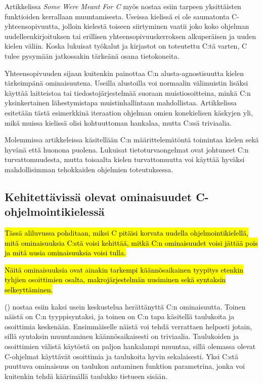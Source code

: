 Artikkelissa \emph{Some Were Meant For C} \citet{somemeantforc} myös nostaa
esiin tarpeen yksittäisten funktioiden kerrallaan muuntamisesta. Useissa
kielissä ei ole saumatonta C-yhteensopivuutta, jolloin kielestä toiseen
siirtyminen vaatii joko koko ohjelman uudelleenkirjoituksen tai erillisen
yhteensopivuuskerroksen alkuperäisen ja uuden kielen väliin. Koska lukuisat
työkalut ja kirjastot on toteutettu C:tä varten, C tulee pysymään jatkossakin
tärkeänä osana tietokoneita.

Yhteensopivuuden sijaan \citeauthor{somemeantforc} kuitenkin painottaa C:n
alusta-agnostisuutta kielen tärkeimpänä ominaisuutena. Useilla alustoilla
voi normaalin välimuistin lisäksi käyttää laitteistoa tai tiedostojärjestelmää
suoraan muistiosoitteina, minkä C:n yksinkertainen lähestymistapa
muistinhallintaan mahdollistaa. Artikkelissa esitetään tästä esimerkkinä
iteraation ohjelman omien konekielisen käskyjen yli, mikä muissa kielissä olisi
kohtuuttoman hankalaa, mutta C:ssä triviaalia.

Molemmissa artikkeleissa käsitellään C:n määrittelemätöntä toimintaa kielen
sekä hyvänä että huonona puolena. Lukuisat tietoturvaongelmat ovat johtuneet
C:n turvattomuudesta, mutta toisaalta kielen turvattomuutta voi käyttää hyväksi
mahdollisimman tehokkaiden ohjelmien toteutuksessa.

\subsection{Kehitettävissä olevat ominaisuudet C-ohjelmointikielessä}
\label{sec:ckehitettavat}

\hl{Tässä aliluvussa pohditaan, miksi C pitäisi korvata uudella
ohjelmointikielellä, mitä ominaisuuksia C:stä voisi kehittää, mitkä C:n
ominaisuudet voisi jättää pois ja mitä uusia ominaisuuksia voisi tulla.}

\hl{Näitä ominaisuuksia ovat ainakin tarkempi käännösaikainen tyypitys etenkin
tyhjien osoittimien osalta, makrojärjestelmän uusiminen sekä syntaksin
selkeyttäminen.}

\citeauthor{chistory} (\citeyear{chistory}) nostaa esiin kaksi usein
keskustelua herättänyttä C:n ominaisuutta. Toinen näistä on C:n tyyppisyntaksi,
ja toinen on C:n tapa käsitellä taulukoita ja osoittimia keskenään.
Ensimmäiselle näistä voi tehdä verrattaen helposti jotain, sillä syntaksin
muuntaminen käännösaikaisesti on triviaalia. Taulukoiden ja osoittimien välistä
käytöstä on paljon hankalampi muuntaa, sillä olemassa olevat C-ohjelmat
käyttävät osoittimia ja taulukoita hyvin sekalaisesti. Yksi C:stä puuttuva
ominaisuus on taulukon antaminen funktion parametrina, jonka voi kuitenkin
tehdä käärimällä taulukko tietueen sisään.

